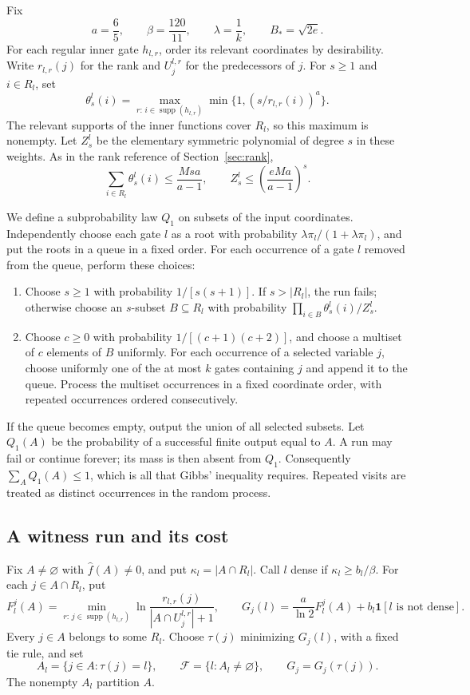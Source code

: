 \documentclass[11pt]{amsart}
\theoremstyle{definition}
\theoremstyle{remark}
\DeclareMathOperator{\supp}{supp}
\newcommand{\wh}[1]{\widehat{#1}}
\begin{document}
Fix
\[
 a=\frac65,\qquad \beta=\frac{120}{11},\qquad \lambda=\frac1k,\qquad B_*=\sqrt{2e}.
\]
For each regular inner gate $h_{l,r}$, order its relevant coordinates by desirability.
Write $r_{l,r}(j)$ for the rank and $U_j^{l,r}$ for the predecessors of $j$.
For $s\ge1$ and $i\in R_l$, set
\[
 \theta_s^l(i)=\max_{r:\,i\in\supp(h_{l,r})}
                  \min\{1,(s/r_{l,r}(i))^a\}.
\]
The relevant supports of the inner functions cover $R_l$, so this maximum is nonempty.
Let $Z_s^l$ be the elementary symmetric polynomial of degree $s$ in these weights.
As in the rank reference of Section~\ref{sec:rank},
\begin{equation}\label{union:normalizer}
 \sum_{i\in R_l}\theta_s^l(i)\le\frac{Msa}{a-1},
 \qquad
 Z_s^l\le\left(\frac{eMa}{a-1}\right)^s.
\end{equation}

We define a subprobability law $Q_1$ on subsets of the input coordinates.
Independently choose each gate $l$ as a root with probability
$\lambda\pi_l/(1+\lambda\pi_l)$, and put the roots in a queue in a fixed order.
For each occurrence of a gate $l$ removed from the queue, perform these choices:
\begin{enumerate}[label=(\roman*)]
\item Choose $s\ge1$ with probability $1/[s(s+1)]$.
If $s>|R_l|$, the run fails; otherwise choose an $s$-subset $B\subseteq R_l$ with probability
$\prod_{i\in B}\theta_s^l(i)/Z_s^l$.
\item Choose $c\ge0$ with probability $1/[(c+1)(c+2)]$, and choose a multiset of $c$ elements of $B$ uniformly.
For each occurrence of a selected variable $j$, choose uniformly one of the at most $k$ gates containing $j$ and append it to the queue.
Process the multiset occurrences in a fixed coordinate order, with repeated occurrences ordered consecutively.
\end{enumerate}
If the queue becomes empty, output the union of all selected subsets.
Let $Q_1(A)$ be the probability of a successful finite output equal to $A$.
A run may fail or continue forever; its mass is then absent from $Q_1$.
Consequently $\sum_AQ_1(A)\le1$, which is all that Gibbs' inequality requires.
Repeated visits are treated as distinct occurrences in the random process.

\subsection{A witness run and its cost}

Fix $A\ne\varnothing$ with $\wh f(A)\ne0$, and put $\kappa_l=|A\cap R_l|$.
Call $l$ dense if $\kappa_l\ge b_l/\beta$.
For each $j\in A\cap R_l$, put
\[
 F_l^j(A)=\min_{r:\,j\in\supp(h_{l,r})}
          \ln\frac{r_{l,r}(j)}{|A\cap U_j^{l,r}|+1},
 \qquad
 G_j(l)=\frac a{\ln2}F_l^j(A)+b_l\mathbf1[l\text{ is not dense}].
\]
Every $j\in A$ belongs to some $R_l$.
Choose $\tau(j)$ minimizing $G_j(l)$, with a fixed tie rule, and set
\[
 A_l=\{j\in A:\tau(j)=l\},\qquad
 \mathcal F=\{l:A_l\ne\varnothing\},\qquad
 G_j=G_j(\tau(j)).
\]
The nonempty $A_l$ partition $A$.
\end{document}
